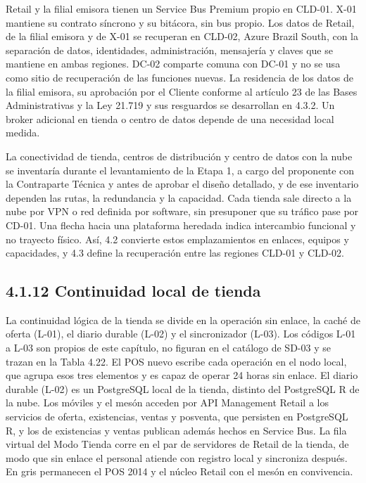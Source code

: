 \documentclass[11pt]{article}
\begin{document}
Retail y la filial emisora tienen un Service Bus Premium propio en CLD-01. X-01 mantiene su contrato síncrono y su bitácora, sin bus propio. Los datos de Retail, de la filial emisora y de X-01 se recuperan en CLD-02, Azure Brazil South, con la separación de datos, identidades, administración, mensajería y claves que se mantiene en ambas regiones. DC-02 comparte comuna con DC-01 y no se usa como sitio de recuperación de las funciones nuevas. La residencia de los datos de la filial emisora, su aprobación por el Cliente conforme al artículo 23 de las Bases Administrativas y la Ley 21.719 y sus resguardos se desarrollan en 4.3.2. Un broker adicional en tienda o centro de datos depende de una necesidad local medida.

La conectividad de tienda, centros de distribución y centro de datos con la nube se inventaría durante el levantamiento de la Etapa 1, a cargo del proponente con la Contraparte Técnica y antes de aprobar el diseño detallado, y de ese inventario dependen las rutas, la redundancia y la capacidad. Cada tienda sale directo a la nube por VPN o red definida por software, sin presuponer que su tráfico pase por CD-01. Una flecha hacia una plataforma heredada indica intercambio funcional y no trayecto físico. Así, 4.2 convierte estos emplazamientos en enlaces, equipos y capacidades, y 4.3 define la recuperación entre las regiones CLD-01 y CLD-02.

\subsection{4.1.12 Continuidad local de tienda}

La continuidad lógica de la tienda se divide en la operación sin enlace, la caché de oferta (L-01), el diario durable (L-02) y el sincronizador (L-03). Los códigos L-01 a L-03 son propios de este capítulo, no figuran en el catálogo de SD-03 y se trazan en la Tabla 4.22. El POS nuevo escribe cada operación en el nodo local, que agrupa esos tres elementos y es capaz de operar 24 horas sin enlace. El diario durable (L-02) es un PostgreSQL local de la tienda, distinto del PostgreSQL R de la nube. Los móviles y el mesón acceden por API Management Retail a los servicios de oferta, existencias, ventas y posventa, que persisten en PostgreSQL R, y los de existencias y ventas publican además hechos en Service Bus. La fila virtual del Modo Tienda corre en el par de servidores de Retail de la tienda, de modo que sin enlace el personal atiende con registro local y sincroniza después. En gris permanecen el POS 2014 y el núcleo Retail con el mesón en convivencia.
\end{document}
